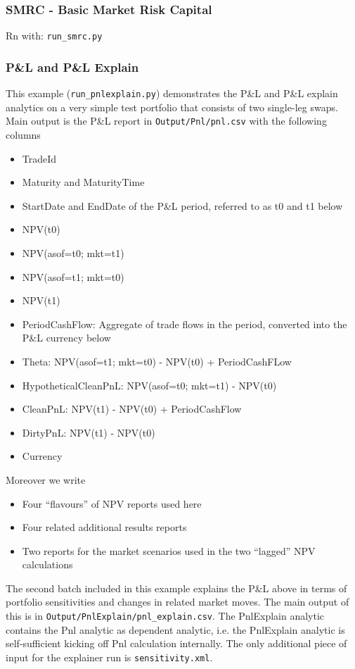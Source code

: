 \subsubsection{SMRC - Basic Market Risk Capital}

Rn with: {\tt run\_smrc.py}

\subsubsection{P\&L and P\&L Explain}
\label{example:marketrisk_pnl}

This example ({\tt run\_pnlexplain.py}) demonstrates the P\&L and P\&L explain analytics
on a very simple test portfolio that consists of two
single-leg swaps. 
Main output is the P\&L report in {\tt Output/Pnl/pnl.csv} with the following columns
\begin{itemize}
\item TradeId
\item Maturity and MaturityTime
\item StartDate and EndDate of the P\&L period, referred to as t0 and t1 below
\item NPV(t0)
\item NPV(asof=t0; mkt=t1)
\item NPV(asof=t1; mkt=t0)
\item NPV(t1)
\item PeriodCashFlow: Aggregate of trade flows in the period, converted into the P\&L currency below
\item Theta: NPV(asof=t1; mkt=t0) - NPV(t0) + PeriodCashFLow
\item HypotheticalCleanPnL: NPV(asof=t0; mkt=t1) - NPV(t0)
\item CleanPnL: NPV(t1) - NPV(t0) + PeriodCashFlow 
\item DirtyPnL: NPV(t1) - NPV(t0)
\item Currency
\end{itemize}
Moreover we write
\begin{itemize}
\item Four ``flavours'' of NPV reports used here
\item Four related additional results reports
\item Two reports for the market scenarios used in the two ``lagged'' NPV calculations
\end{itemize}

The second batch included in this example explains the
P\&L above in terms of portfolio sensitivities and changes in related market moves. The main output of this
is in {\tt Output/PnlExplain/pnl\_explain.csv}. The PnlExplain analytic contains the Pnl analytic as dependent
analytic, i.e. the PnlExplain analytic is self-sufficient kicking off Pnl calculation internally. 
The only additional piece of input for the explainer run is {\tt sensitivity.xml}.

